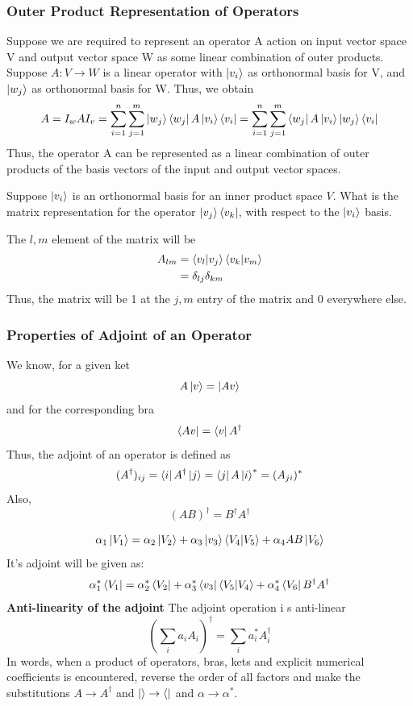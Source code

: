 \subsubsection{Outer Product Representation of Operators}
Suppose we are required to represent an operator A action on input vector space V and output vector space W as some linear 
combination of outer products. Suppose $A:V\rightarrow W$ is a linear operator with $\ket{v_i}$ as orthonormal basis for V, and $\ket{w_j}$ as
orthonormal basis for W. Thus, we obtain
\[ A = I_w A I_v = \sum_{i=1}^n \sum_{j=1}^m \ket{w_j}\bra{w_j}A\ket{v_i}\bra{v_i}=\sum_{i=1}^n \sum_{j=1}^m \bra{w_j}A\ket{v_i} \ket{w_j}\bra{v_i} \]
Thus, the operator A can be represented as a linear combination of outer products of the basis vectors of the input and output vector spaces.
\begin{example}
    Suppose $\ket{v_i}$ is an orthonormal basis for an inner product space $V$. What is the matrix representation for the operator $\ket{v_j}\bra{v_k}$, with respect to the $\ket{v_i}$ basis.

    The $l,m$ element of the matrix will be
    \begin{align*}
    A_{lm}&=\braket{v_l|v_j}\braket{v_k|v_m}\\
    &=\delta_{lj}\delta_{km}
    \end{align*}
   Thus, the matrix will be 1 at the $j,m$ entry of the matrix and 0 everywhere else.

\end{example}
\subsubsection{Properties of Adjoint of an Operator}
We know, for a given ket
\[A\ket{v}=\ket{Av}\]
and for the corresponding bra
\[\bra{Av}=\bra{v}A^{\dagger}\]
Thus, the adjoint of an operator is defined as
\[ (A^{\dagger})_{ij}=\bra{i}A^{\dagger}\ket{j}=\bra{j}A\ket{i}^*=(A_{ji})^* \]
Also,
\[ (AB)^{\dagger}=B^{\dagger}A^{\dagger} \]
\begin{example}
    \[\alpha_1\ket{V_1}=\alpha_2\ket{V_2}+\alpha_3\ket{v_3}\braket{V_4|V_5} + \alpha_4AB\ket{V_6}\]
    It's adjoint will be given as:
    \[\alpha_1^*\bra{V_1}=\alpha_2^*\bra{V_2}+\alpha_3^*\bra{v_3}\braket{V_5|V_4} + \alpha_4^*\bra{V_6}B^{\dagger}A^{\dagger}\]
    \textbf{Anti-linearity of the adjoint} The adjoint operation i s anti-linear
    \[
        \left(\sum_ia_iA_i\right)^{\dagger}=\sum_i a_i^* A_i^{\dagger}
    \]
    In words, when a product of operators, bras, kets and explicit numerical coefficients is encountered, reverse the order of all factors 
    and make the substitutions $A \rightarrow A^{\dagger}$ and $\ket{} \rightarrow \bra{}$ and $\alpha \rightarrow \alpha^*$.
\end{example}

